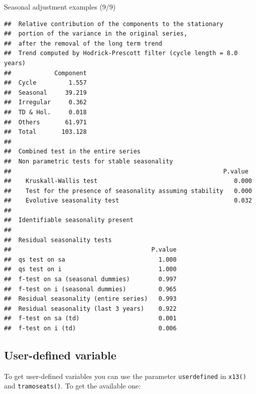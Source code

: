 \documentclass[10pt,xcolor=table,color={dvipsnames,usenames},ignorenonframetext,usepdftitle=false,french]{beamer}
\newenvironment{Shaded}{\begin{snugshade}}{\end{snugshade}}
\newcommand{\NormalTok}[1]{#1}
\newcommand{\OperatorTok}[1]{\textcolor[rgb]{0.81,0.36,0.00}{\textbf{#1}}}
\begin{document}
\begin{frame}[fragile]{Seasonal adjustment examples (9/9)}
\protect\hypertarget{seasonal-adjustment-examples-99}{}

\footnotesize

\begin{Shaded}
\end{Shaded}

\begin{verbatim}
##  Relative contribution of the components to the stationary
##  portion of the variance in the original series,
##  after the removal of the long term trend 
##  Trend computed by Hodrick-Prescott filter (cycle length = 8.0 years)
##            Component
##  Cycle         1.557
##  Seasonal     39.219
##  Irregular     0.362
##  TD & Hol.     0.018
##  Others       61.971
##  Total       103.128
## 
##  Combined test in the entire series 
##  Non parametric tests for stable seasonality
##                                                           P.value
##    Kruskall-Wallis test                                      0.000
##    Test for the presence of seasonality assuming stability   0.000
##    Evolutive seasonality test                                0.032
##  
##  Identifiable seasonality present
## 
##  Residual seasonality tests 
##                                       P.value
##  qs test on sa                          1.000
##  qs test on i                           1.000
##  f-test on sa (seasonal dummies)        0.997
##  f-test on i (seasonal dummies)         0.965
##  Residual seasonality (entire series)   0.993
##  Residual seasonality (last 3 years)    0.922
##  f-test on sa (td)                      0.001
##  f-test on i (td)                       0.006
\end{verbatim}

\end{frame}

\hypertarget{user-defined-variable}{%
\subsection{User-defined variable}\label{user-defined-variable}}

To get user-defined variables you can use the parameter
\texttt{userdefined} in \texttt{x13()} and \texttt{tramoseats()}. To get
the available one:
\end{document}
